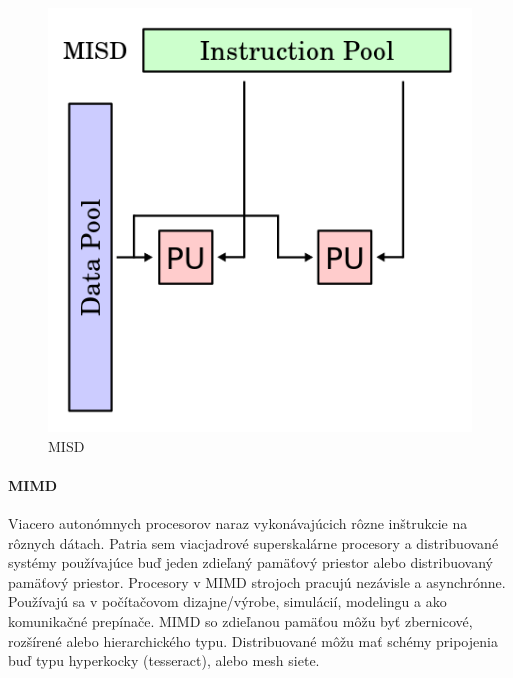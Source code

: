 \documentclass[11pt,a4paper]{report}
\begin{document}
\begin{figure}[ht]
        \centering
        \includegraphics[scale=0.25]{images/MISD}
        \caption{MISD}
        \label{MISD:}
\end{figure}

\paragraph{MIMD} Viacero autonómnych procesorov naraz vykonávajúcich rôzne inštrukcie na rôznych dátach. Patria sem viacjadrové superskalárne procesory a distribuované systémy používajúce buď jeden zdieľaný pamäťový priestor alebo distribuovaný pamäťový priestor. Procesory v MIMD strojoch pracujú nezávisle a asynchrónne. Používajú sa v počítačovom dizajne/výrobe, simulácií, modelingu a ako komunikačné prepínače. MIMD so zdieľanou pamäťou môžu byť zbernicové, rozšírené alebo hierarchického typu. Distribuované môžu mať schémy pripojenia buď typu hyperkocky (tesseract), alebo mesh siete.
\end{document}
